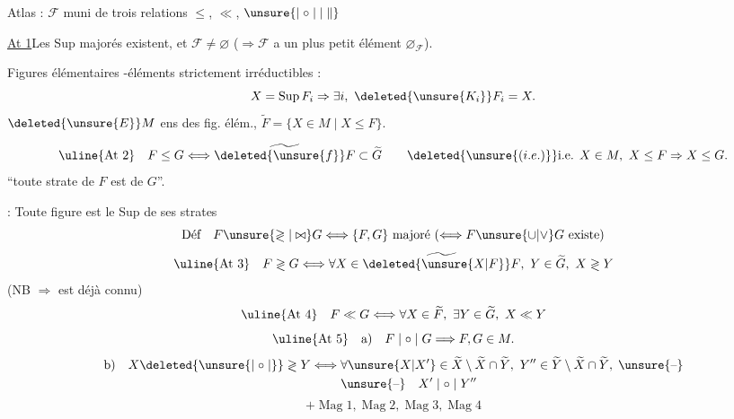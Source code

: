 Atlas : $\mathscr{F}$ muni de trois relations $\leq$, $\ll$, $\unsure{\mid\circ\mid|\parallel}$

\uline{At 1}\quad Les Sup majorés existent, et $\mathscr{F}\neq\varnothing$ ($\Rightarrow\mathscr{F}$ a un plus petit élément $\varnothing_{\mathscr{F}}$).

 Figures élémentaires \unsure{$\cup$|$\vee$}-éléments strictement irréductibles :
\[
X=\operatorname{Sup}F_i\Rightarrow\exists i,\ \deleted{\unsure{K_i}}F_i=X.
\]
$\deleted{\unsure{E}}M$ ens des fig. élém., $\widetilde{F}=\{X\in M\mid X\leq F\}$.

\[
\text{\uline{At 2}}\quad F\leq G\Longleftrightarrow\widetilde{\deleted{\unsure{f}}F}\subset\widetilde{G}\qquad\deleted{\unsure{(i.e.)}}\text{i.e. }X\in M,\ X\leq F\Rightarrow X\leq G.
\]
``toute strate de $F$ est  de $G$''.

 : Toute figure est le Sup de ses strates
\[
\text{Déf}\quad F\unsure{\gtrless|\bowtie}G\Longleftrightarrow\{F,G\}\text{ majoré }(\Longleftrightarrow F\unsure{\cup|\vee}G\text{ existe})
\]
\[
\text{\uline{At 3}}\quad F\gtrless G\Longleftrightarrow\forall X\in\widetilde{\deleted{\unsure{X|F}}F},\ Y\in\widetilde{G},\ X\gtrless Y
\]
(NB $\Rightarrow$ est déjà connu)
\[
\text{\uline{At 4}}\quad F\ll G\Longleftrightarrow\forall X\in\widetilde{F},\ \exists Y\in\widetilde{G},\ X\ll Y
\]
\[
\text{\uline{At 5}}\quad\text{a)}\quad F\mid\circ\mid G\Longrightarrow F,G\in M.
\]
\[
\begin{aligned}
\text{b)}\quad X\deleted{\unsure{\mid\circ\mid}}\gtrless Y\Longleftrightarrow{}&\forall\unsure{X|X'}\in\widetilde{X}\setminus\widetilde{X}\cap\widetilde{Y},\ Y''\in\widetilde{Y}\setminus\widetilde{X}\cap\widetilde{Y},\;\unsure{\text{--}}\\
&\unsure{\text{--}}\quad X'\mid\circ\mid Y''
\end{aligned}
\]
\[
+\operatorname{Mag}1,\operatorname{Mag}2,\operatorname{Mag}3,\operatorname{Mag}4
\]

